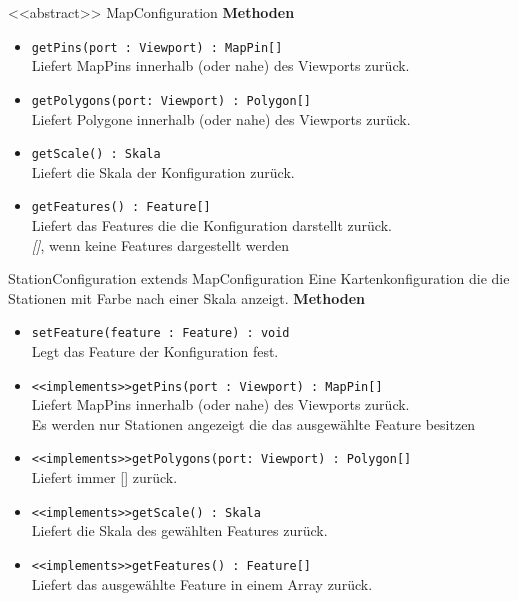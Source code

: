 \begin{Class}{<<abstract>> MapConfiguration}
    \textbf{Methoden}
    \begin{itemize}
        \item \texttt{getPins(port : Viewport) : MapPin[]}
        \\ Liefert MapPins innerhalb (oder nahe) des Viewports zurück.
        \item \texttt{getPolygons(port: Viewport) : Polygon[]}
        \\ Liefert Polygone innerhalb (oder nahe) des Viewports zurück.
        \item \texttt{getScale() : Skala}
        \\ Liefert die Skala der Konfiguration zurück.
        \item \texttt{getFeatures() : Feature[]}
        \\ Liefert das Features die die Konfiguration darstellt zurück.
        \\ \emph{[]}, wenn keine Features dargestellt werden
    \end{itemize}
\end{Class}

\begin{Class}{StationConfiguration extends MapConfiguration}
    Eine Kartenkonfiguration die die Stationen mit Farbe nach einer Skala anzeigt.
    \textbf{Methoden}
    \begin{itemize}
        \item \texttt{setFeature(feature : Feature) : void}
        \\ Legt das Feature der Konfiguration fest.
        \item \texttt{<<implements>>getPins(port : Viewport) : MapPin[]}
        \\ Liefert MapPins innerhalb (oder nahe) des Viewports zurück.
        \\ Es werden nur Stationen angezeigt die das ausgewählte Feature besitzen
        \item \texttt{<<implements>>getPolygons(port: Viewport) : Polygon[]}
        \\ Liefert immer [] zurück.
        \item \texttt{<<implements>>getScale() : Skala}
        \\ Liefert die Skala des gewählten Features zurück.
        \item \texttt{<<implements>>getFeatures() : Feature[]}
        \\ Liefert das ausgewählte Feature in einem Array zurück.
    \end{itemize}
\end{Class}

